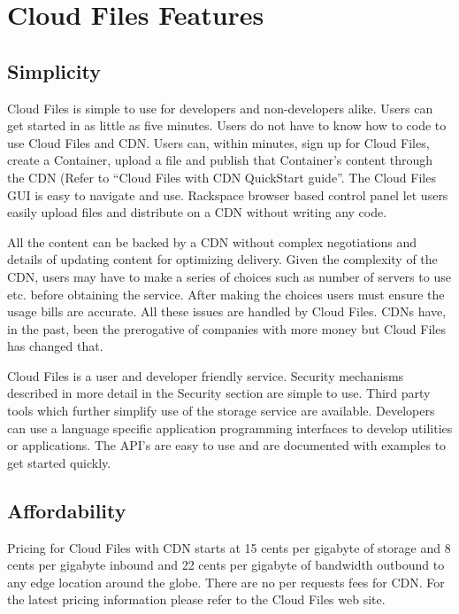 \documentclass[letterpaper,10pt,english]{manual}
\begin{document}
\chapter{Cloud Files Features}


\section{Simplicity}

Cloud Files is simple to use for developers and non-developers alike.
Users can get started in as little as five minutes. Users do not have
to know how to code to use Cloud Files and CDN.  Users can, within
minutes, sign up for Cloud Files, create a Container, upload a file and
publish that Container’s content through the CDN (Refer to “Cloud Files
with CDN QuickStart guide”. The Cloud Files GUI is easy to navigate and
use. Rackspace browser based control panel let users easily upload files
and distribute on a CDN without writing any code.

All the content can be backed by a CDN without complex negotiations and
details of updating content for optimizing delivery.  Given the complexity
of the CDN, users may have to make a series of choices such as number of
servers to use etc. before obtaining the service.  After making the choices
users must ensure the usage bills are accurate.  All these issues are
handled by Cloud Files. CDNs have, in the past, been the prerogative of
companies with more money but Cloud Files has changed that.

Cloud Files is a user and developer friendly service. Security mechanisms
described in more detail in the Security section are simple to use. Third
party tools which further simplify use of the storage service are available.
Developers can use a language specific application programming interfaces
to develop utilities or applications.  The API’s are easy to use and are
documented with examples to get started quickly.


\section{Affordability}

Pricing for Cloud Files with CDN starts at 15 cents per gigabyte of storage
and 8 cents per gigabyte inbound and 22 cents per gigabyte of bandwidth
outbound to any edge location around the globe. There are no per requests
fees for CDN. For the latest pricing information please refer to the Cloud
Files web site.
\end{document}
